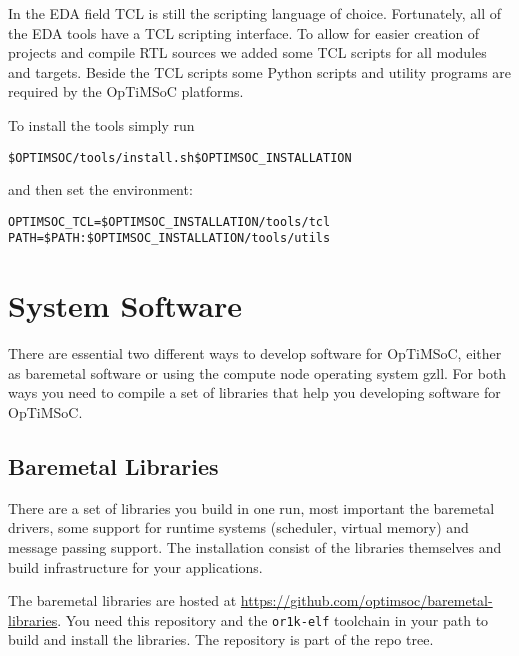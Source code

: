 In the EDA field TCL is still the scripting language of choice.
Fortunately, all of the EDA tools have a TCL scripting interface. To
allow for easier creation of projects and compile RTL sources we added
some TCL scripts for all modules and targets. Beside the TCL scripts
some Python scripts and utility programs are required by the OpTiMSoC
platforms.

To install the tools simply run

\begin{alltt}
\$OPTIMSOC/tools/install.sh \$OPTIMSOC_INSTALLATION
\end{alltt}

and then set the environment:

\begin{alltt}
OPTIMSOC_TCL=\$OPTIMSOC_INSTALLATION/tools/tcl
PATH=\$PATH:\$OPTIMSOC_INSTALLATION/tools/utils
\end{alltt}

\section{System Software}

There are essential two different ways to develop software for
OpTiMSoC, either as baremetal software or using the compute node
operating system gzll. For both ways you need to compile a set of
libraries that help you developing software for OpTiMSoC.

\subsection{Baremetal Libraries}

There are a set of libraries you build in one run, most important the
baremetal drivers, some support for runtime systems (scheduler,
virtual memory) and message passing support. The installation consist
of the libraries themselves and build infrastructure for your
applications.

The baremetal libraries are hosted at
\url{https://github.com/optimsoc/baremetal-libraries}. You need this
repository and the \verb|or1k-elf| toolchain in your path to build and
install the libraries. The repository is part of the repo tree.



